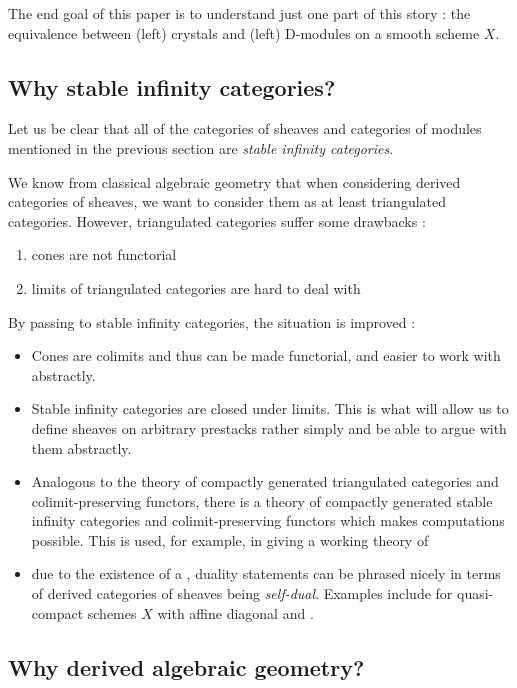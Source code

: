 \documentclass[./main.tex]{subfiles}
\begin{document}
The end goal of this paper is to understand just one part of this story : 
the equivalence between (left) crystals and (left) D-modules on
a smooth scheme $X$.

\subsection{Why stable infinity categories?}

Let us be clear that all of the categories of sheaves and categories
of modules mentioned in the previous section are 
\emph{stable infinity categories}.

We know from classical algebraic geometry that
when considering derived categories of sheaves,
we want to consider them as at least triangulated categories.
However, triangulated categories suffer some drawbacks : 
\begin{enumerate}
  \item cones are not functorial
  \item limits of triangulated categories are hard to deal with
\end{enumerate}
By passing to stable infinity categories, the situation is improved : 
\begin{itemize}
  \item Cones are colimits and thus can be made functorial,
  and easier to work with abstractly.
  \item Stable infinity categories are closed under limits.
  This is what will allow us to define sheaves on arbitrary prestacks
  rather simply and be able to argue with them abstractly.
  \item Analogous to the 
  theory of compactly generated triangulated categories and 
  colimit-preserving functors,
  there is a theory of compactly generated stable infinity categories
  and colimit-preserving functors which makes computations possible.
  This is used, for example, 
  in giving a working theory of 
  \item due to the existence of a ,
  duality statements can be phrased nicely in terms of
  derived categories of sheaves being \emph{self-dual}.
  Examples include 
   for quasi-compact schemes
  $X$ with affine diagonal and .
\end{itemize}

\subsection{Why derived algebraic geometry?}
\end{document}
